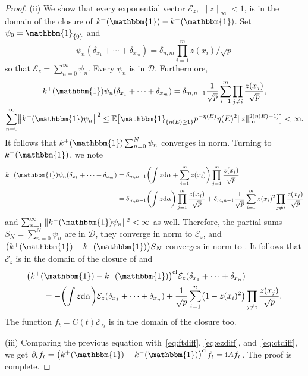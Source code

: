 \documentclass[10pt,a4paper]{amsart}
\numberwithin{equation}{section}
\newcommand{\E}{\mathbb{E}}
\newcommand{\dd}{\mathrm{d}} %
\newcommand{\1}{\mathbbm{1}}
\begin{document}
\begin{proof}
(ii) We show that every exponential vector $\mathcal E_z$, $\|z\|_\infty <1$, is in the domain of the closure of $k^+(\1) - k^-(\1)$. Set $\psi_0 = \1_{\{0\}}$ and
\[
\psi_n(\delta_{x_1}+\cdots +\delta_{x_m}) = \delta_{n,m} \prod_{i=1}^m z(x_i)/\sqrt p
\]
 so that $\mathcal E_z = \sum_{n=0}^\infty \psi_n$. Every $\psi_n$ is in $\mathcal D$. Furthermore,
\begin{gather*}
	k^+(\1) \psi_n (\delta_{x_1}+\cdots +\delta_{x_m}) = \delta_{m,n+1}
		\frac 1 {\sqrt p} \sum_{i=1}^m \prod_{j\neq i} \frac{z(x_j)}{\sqrt p},
\\
	\sum_{n=0}^\infty \bigl\|k^+(\1) \psi_n\bigr\|^2 \leq \E\bigl[ \1_{\{\eta(E)\geq 1\}} p^{- \eta(E)} \eta(E)^2 \|z\|_\infty^{2(\eta(E) - 1)}\bigr]< \infty.
\end{gather*}
It follows that $k^+(\1) \sum_{n=0}^N \psi_n$ converges in norm. Turning to $k^-(\1)$, we note
\begin{align*}
	k^-(\1) \psi_n(\delta_{x_1}+\cdots +\delta_{x_m}) &{} = \delta_{m,n-1}\biggl( \int z \dd \alpha+ \sum_{i=1}^m z(x_i)\biggr) \prod_{j=1}^m \frac{z(x_i)}{\sqrt p}\\
	&{} = \delta_{m,n-1} \biggl( \int z \dd\alpha\biggr)\prod_{j=1}^m \frac{z(x_j)}{\sqrt p}
	+ \delta_{m,n-1} \frac{1}{\sqrt p} \sum_{i=1}^m z(x_i)^2 \prod_{j\neq i} \frac{z(x_j)}{\sqrt p}
\end{align*}
and $\sum_{n=1}^\infty \|k^-(\1) \psi_n\|^2 <\infty$ as well. Therefore, the partial sums $S_N = \sum_{n=0}^N \psi_n$ are in $\mathcal D$, they converge in norm to $\mathcal E_z$, and $\bigl(k^+(\1)-k^-(\1)\bigr)S_N$ converges in norm to \smash{$\sum_n \bigl(k^+(\1)-k^-(\1)\bigr)\psi_n$}. It follows that $\mathcal E_z$ is in the domain of the closure of \smash{$\bigl(k^+(\1) - k^-(\1)\bigr)$} and
\begin{align}
&	\bigl(k^+(\1)-k^-(\1)\bigr)^\mathrm{cl} \mathcal E_z(\delta_{x_1}+\cdots + \delta_{x_n})\nonumber\\
& \qquad{}	= - \biggl(\int z \dd \alpha\biggr) \mathcal E_z(\delta_{x_1}+\cdots + \delta_{x_n})
	 + \frac{1}{\sqrt p} \sum_{i=1}^n \bigl( 1- z(x_i)^2\bigr) \prod_{j\neq i} \frac{z(x_j)}{\sqrt p}.\label{eq:kpmft}
\end{align}
The function $f_t = C(t) \mathcal E_{z_t}$ is in the domain of the closure too.

(iii) Comparing the previous equation with~\eqref{eq:ftdiff}, \eqref{eq:ezdiff}, and~\eqref{eq:ctdiff}, we get $\partial_t f_t = \bigl(k^+(\1) - \smash{k^-(\1)\bigr)^\mathrm{cl}} f_t = \mathrm i A f_t$. The proof is complete.
\end{proof}
\end{document}
